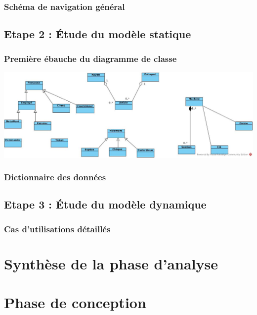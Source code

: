 \documentclass[a4paper,table]{article}
\begin{document}
\subsubsection{Schéma de navigation général}

\subsection{Etape 2 : Étude du modèle statique}

\subsubsection{Première ébauche du diagramme de classe}

\includegraphics[width=\textwidth]{images/Class_Diagram.jpg}

\subsubsection{Dictionnaire des données}

\subsection{Etape 3 : Étude du modèle dynamique}

\subsubsection{Cas d'utilisations détaillés}

\newpage

\section{Synthèse de la phase d'analyse}

\newpage

\section{Phase de conception}
\end{document}
